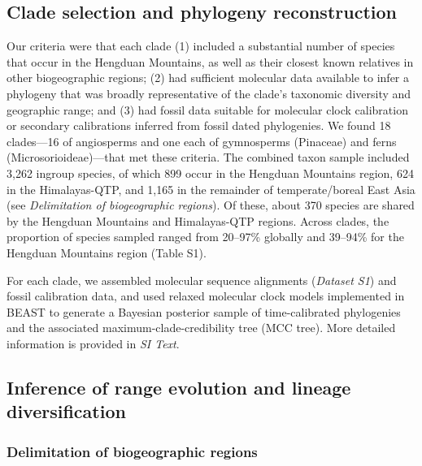 
\subsection*{Clade selection and phylogeny reconstruction}

Our criteria were that each clade (1) included a substantial number of species that occur in the Hengduan Mountains, as well as their closest known relatives in other biogeographic regions; (2) had sufficient molecular data available to infer a phylogeny that was broadly representative of the clade's taxonomic diversity and geographic range; and (3) had fossil data suitable for molecular clock calibration or secondary calibrations inferred from fossil dated phylogenies. We found 18 clades---16 of angiosperms and one each of gymnosperms (Pinaceae) and ferns (Microsorioideae)---that met these criteria. The combined taxon sample included 3,262 ingroup species, of which 899 occur in the Hengduan Mountains region, 624 in the Himalayas-QTP, and 1,165 in the remainder of temperate/boreal East Asia (see \textit{Delimitation of biogeographic regions}). Of these, about 370 species are shared by the Hengduan Mountains and Himalayas-QTP regions. Across clades, the proportion of species sampled ranged from 20--97\% globally and 39--94\% for the Hengduan Mountains region (Table S1).

For each clade, we assembled molecular sequence alignments
(\textit{Dataset S1}) and fossil calibration data, and used relaxed
molecular clock models implemented in BEAST
\citep{Drummond2012,Bouckaert2014} to generate a Bayesian posterior
sample of time-calibrated phylogenies and the associated
maximum-clade-credibility tree (MCC tree).  More detailed information
is provided in \textit{SI Text}.


\subsection*{Inference of range evolution and lineage diversification}

\subsubsection*{Delimitation of biogeographic regions}

